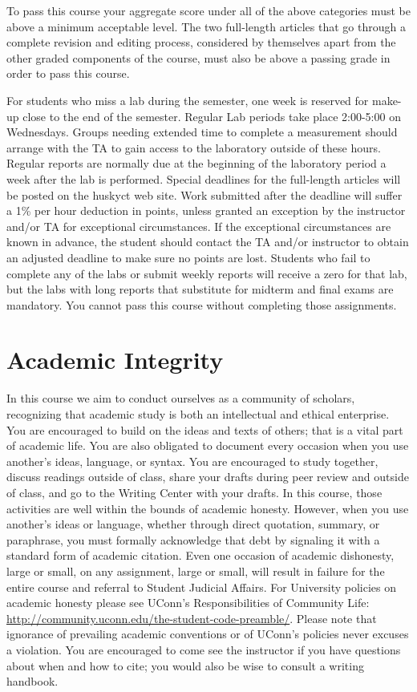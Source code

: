 \documentclass{revtex4}
\begin{document}
To pass this course your aggregate score under all of the above
categories must be above a minimum acceptable level.  The two
full-length articles that go through a complete revision and
editing process, considered by themselves apart from the other
graded components of the course, must also be above a passing
grade in order to pass this course.

For students who miss a lab during the semester, one week is
reserved for make-up close to the end of the semester.  Regular
Lab periods take place 2:00-5:00 on Wednesdays.  Groups needing
extended time to complete a measurement should arrange with
the TA to gain access to the laboratory outside of these hours.
Regular reports are normally due at the beginning of the laboratory
period a week after the lab is performed.  Special deadlines for
the full-length articles
will be posted on the huskyct web site.  Work submitted after the
deadline will suffer a 1\% per hour deduction in points, unless
granted an exception by the instructor and/or TA for exceptional
circumstances.  If the exceptional circumstances are known in
advance, the student should contact the TA and/or instructor to
obtain an adjusted deadline to make sure no points are lost.
Students who fail to complete any of the labs or submit weekly
reports will receive a zero for that lab, but the labs with long
reports that substitute for midterm and final exams are mandatory.
You cannot pass this course without completing those assignments.

\section{Academic Integrity}
In this course we aim to conduct ourselves as a community of scholars,
recognizing that academic study is both an intellectual and ethical enterprise.
You are encouraged to build on the ideas and texts of others; that is a vital
part of academic life. You are also obligated to document every occasion when
you use another's ideas, language, or syntax. You are encouraged to study
together, discuss readings outside of class, share your drafts during peer
review and outside of class, and go to the Writing Center with your drafts.
In this course, those activities are well within the bounds of academic honesty.
However, when you use another's ideas or language, whether through direct
quotation, summary, or paraphrase, you must formally acknowledge that debt by
signaling it with a standard form of academic citation. Even one occasion of
academic dishonesty, large or small, on any assignment, large or small, will
result in failure for the entire course and referral to Student Judicial
Affairs. For University policies on academic honesty please see UConn's
Responsibilities of Community Life: 
\url{http://community.uconn.edu/the-student-code-preamble/}.
Please note that ignorance of prevailing academic conventions or of
UConn's policies never excuses a violation. You are encouraged to come see
the instructor if you have questions about when and how to cite; you would
also be wise to consult a writing handbook.
\end{document}
